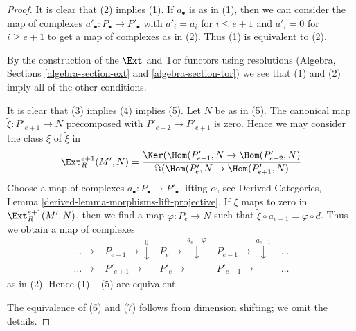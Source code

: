\begin{proof}
It is clear that (2) implies (1). If $a_\bullet$ is as in (1), then
we can consider the map of complexes $a'_\bullet : P_\bullet \to P'_\bullet$
with $a'_i = a_i$ for $i \leq e + 1$ and $a'_i = 0$ for $i \geq e + 1$
to get a map of complexes as in (2). Thus (1) is equivalent to (2).

\medskip\noindent
By the construction of the $\Ext$ and $\text{Tor}$ functors using
resolutions (Algebra, Sections \ref{algebra-section-ext}
and \ref{algebra-section-tor}) we see
that (1) and (2) imply all of the other conditions.

\medskip\noindent
It is clear that (3) implies (4) implies (5). Let $N$ be as in (5).
The canonical map $\tilde \xi : P'_{e + 1} \to N$ precomposed with
$P'_{e + 2} \to P'_{e + 1}$ is zero. Hence we may consider the class
$\xi$ of $\tilde \xi$ in
$$
\Ext^{e + 1}_R(M', N) =
\frac{\Ker(\Hom(P'_{e + 1}, N \to \Hom(P'_{e + 2}, N)}{
\Im(\Hom(P'_e, N \to \Hom(P'_{e + 1}, N)}
$$
Choose a map of complexes $a_\bullet : P_\bullet \to P'_\bullet$
lifting $\alpha$, see Derived Categories, Lemma
\ref{derived-lemma-morphisms-lift-projective}.
If $\xi$ maps to zero in $\Ext^{e + 1}_R(M', N)$, then
we find a map $\varphi : P_e \to N$ such that
$\tilde \xi  \circ a_{e + 1} = \varphi \circ d$.
Thus we obtain a map of complexes
$$
\begin{array}{ccccc}\ldots \longrightarrow & P_{e + 1} \longrightarrow\overset{0}{\downarrow} & P_e \longrightarrow\overset{a_e - \varphi}{\downarrow} & P_{e - 1} \longrightarrow\overset{a_{e - 1}}{\downarrow} & \ldots \\ \ldots \longrightarrow & P'_{e + 1} \longrightarrow & P'_e \longrightarrow & P'_{e - 1} \longrightarrow & \ldots\end{array}
$$
as in (2). Hence (1) -- (5) are equivalent.

\medskip\noindent
The equivalence of (6) and (7) follows from dimension shifting;
we omit the details.


\end{proof}
